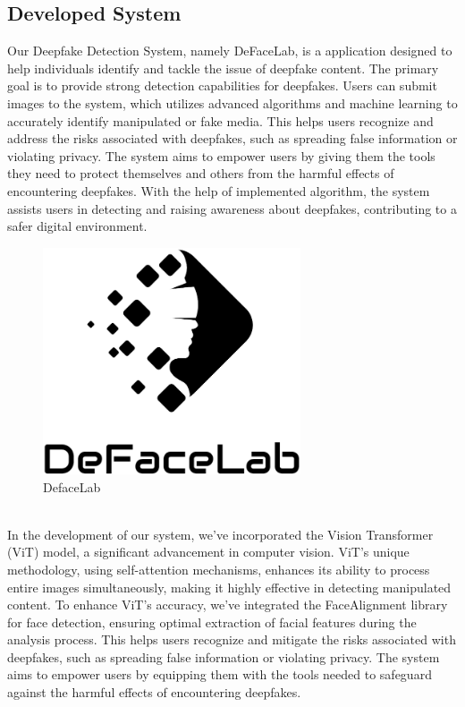 \subsection{Developed System}

Our Deepfake Detection System, namely DeFaceLab, is a application designed to help individuals identify and tackle the issue of deepfake content. The primary goal is to provide strong detection capabilities for deepfakes. Users can submit images to the system, which utilizes advanced algorithms and machine learning to accurately identify manipulated or fake media. This helps users recognize and address the risks associated with deepfakes, such as spreading false information or violating privacy. The system aims to empower users by giving them the tools they need to protect themselves and others from the harmful effects of encountering deepfakes. With the help of implemented algorithm, the system assists users in detecting and raising awareness about deepfakes, contributing to a safer digital environment.\\
\begin{figure}[h]
    \centering
    \includegraphics[width= 3in ]{img/logoblack.png}
    \caption{DefaceLab}
\end{figure}
\\
In the development of our system, we've incorporated the Vision Transformer (ViT) model, a significant advancement in computer vision. ViT's unique methodology, using self-attention mechanisms, enhances its ability to process entire images simultaneously, making it highly effective in detecting manipulated content. To enhance ViT's accuracy, we've integrated the FaceAlignment library for face detection, ensuring optimal extraction of facial features during the analysis process. This helps users recognize and mitigate the risks associated with deepfakes, such as spreading false information or violating privacy. The system aims to empower users by equipping them with the tools needed to safeguard against the harmful effects of encountering deepfakes.